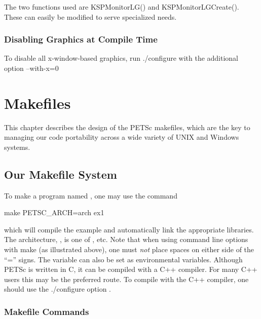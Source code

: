 {{{The two functions used are KSPMonitorLG() 
and KSPMonitorLGCreate(). These 
can easily be modified to serve specialized needs.


\subsection{Disabling Graphics at Compile Time}

To disable all x-window-based graphics, run ./configure with the
additional option --with-x=0


\cleardoublepage
\chapter{Makefiles}
\label{ch_makefiles}

This chapter describes the design of the PETSc makefiles, which are the
key to managing our code portability across a wide variety of UNIX and Windows systems.

\section{Our Makefile System}

To make a program named , one may use the command
\begin{tabbing}
   make PETSC\_ARCH=arch  ex1
\end{tabbing}
which will compile the 
example and automatically link the appropriate libraries.  The
architecture, , is one of , etc. Note
that when using command line options with make (as illustrated above),
one must {\em not} place spaces on either side of the ``='' signs.
The variable
 can also be set as environmental
variables.  Although PETSc is written in C, it can be compiled with a 
C++ compiler.  For many C++ users this may be the preferred route. To compile
with the C++ compiler, one should use the ./configure option . 

\subsection{Makefile Commands} \label{sec_common}

}}}
